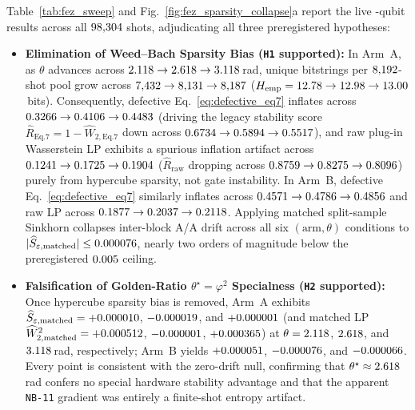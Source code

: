 \documentclass[aps,prapplied,reprint,longbibliography]{revtex4-2}
\begin{document}
Table~\ref{tab:fez_sweep} and Fig.~\ref{fig:fez_sparsity_collapse}a report the live \WpFezQubits{}-qubit results across all $98{,}304{}$ shots, adjudicating all three preregistered hypotheses:
\begin{itemize}
\item \textbf{Elimination of Weed--Bach Sparsity Bias (\texttt{H1} supported):} In Arm~A, as $\theta$ advances across $2.118{} \to 2.618{} \to 3.118{}$\,rad, unique bitstrings per $8{,}192{}$-shot pool grow across $7{,}432{} \to 8{,}131{} \to 8{,}187{}$ ($H_{\mathrm{emp}} = 12.78{} \to 12.98{} \to 13.00{}$\,bits). Consequently, defective Eq.~\eqref{eq:defective_eq7} inflates across $0.3266{} \to 0.4106{} \to 0.4483{}$ (driving the legacy stability score $\widehat{R}_{\mathrm{Eq.7}} = 1 - \widehat{W}_{2,\mathrm{Eq.7}}$ down across $0.6734{} \to 0.5894{} \to 0.5517{}$), and raw plug-in Wasserstein LP exhibits a spurious inflation artifact across $0.1241{} \to 0.1725{} \to 0.1904{}$ ($\widehat{R}_{\mathrm{raw}}$ dropping across $0.8759{} \to 0.8275{} \to 0.8096{}$) purely from hypercube sparsity, not gate instability. In Arm~B, defective Eq.~\eqref{eq:defective_eq7} similarly inflates across $0.4571{} \to 0.4786{} \to 0.4856{}$ and raw LP across $0.1877{} \to 0.2037{} \to 0.2118{}$. Applying matched split-sample Sinkhorn collapses inter-block A/A drift across all six $(\text{arm},\theta)$ conditions to $|\widehat{S}_{\varepsilon,\mathrm{matched}}| \le 0.000076{}$, nearly two orders of magnitude below the preregistered $0.005{}$ ceiling.
\item \textbf{Falsification of Golden-Ratio $\theta^\star = \varphi^2$ Specialness (\texttt{H2} supported):} Once hypercube sparsity bias is removed, Arm~A exhibits $\widehat{S}_{\varepsilon,\mathrm{matched}} = +0.000010{}$, $-0.000019{}$, and $+0.000001{}$ (and matched LP $\widehat{W}_{2,\mathrm{matched}}^2 = +0.000512{}$, $-0.000001{}$, $+0.000365{}$) at $\theta = 2.118{}$, $2.618{}$, and $3.118{}$\,rad, respectively; Arm~B yields $+0.000051{}$, $-0.000076{}$, and $-0.000066{}$. Every point is consistent with the zero-drift null, confirming that $\theta^\star \approx 2.618{}$\,rad confers no special hardware stability advantage and that the apparent \texttt{NB-11} gradient was entirely a finite-shot entropy artifact.

\end{itemize}
\end{document}
